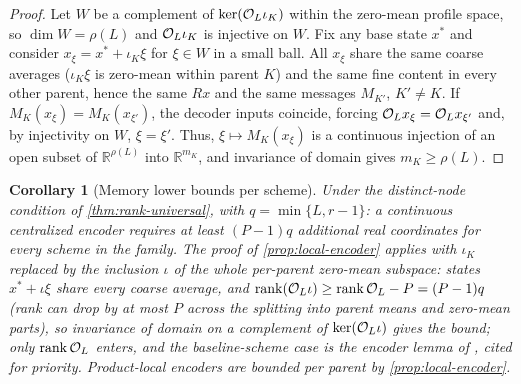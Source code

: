 \documentclass[pdflatex,sn-mathphys-num]{sn-jnl}%
\theoremstyle{thmstyleone}%
\newtheorem{corollary}{Corollary}%
\theoremstyle{thmstyletwo}%
\theoremstyle{thmstylethree}%
\newcommand{\R}{\mathbb R}
\DeclareMathOperator{\rank}{rank}
\newcommand{\OL}{{\cal O}_L}
\begin{document}
\begin{proof}
Let $W$ be a complement of $\ker(\OL\iota_K)$ within the zero-mean profile space, so $\dim W=\rho(L)$ and $\OL\iota_K$ is injective on $W$.
Fix any base state $x^\ast$ and consider $x_\xi=x^\ast+\iota_K\xi$ for $\xi\in W$ in a small ball.
All $x_\xi$ share the same coarse averages ($\iota_K\xi$ is zero-mean within parent $K$) and the same fine content in every other parent, hence the same $Rx$ and the same messages $M_{K'}$, $K'\ne K$.
If $M_K(x_\xi)=M_K(x_{\xi'})$, the decoder inputs coincide, forcing $\OL x_\xi=\OL x_{\xi'}$ and, by injectivity on $W$, $\xi=\xi'$.
Thus, $\xi\mapsto M_K(x_\xi)$ is a continuous injection of an open subset of $\R^{\rho(L)}$ into $\R^{m_K}$, and invariance of domain gives $m_K\ge\rho(L)$.
\end{proof}

\begin{corollary}[Memory lower bounds per scheme]\label{cor:memory-bounds}
Under the distinct-node condition of \cref{thm:rank-universal}, with $q=\min\{L,r-1\}$: a continuous centralized encoder requires at least $(P-1)q$ additional real coordinates for every scheme in the family.
The proof of \cref{prop:local-encoder} applies with $\iota_K$ replaced by the inclusion $\iota$ of the whole per-parent zero-mean subspace: states $x^\ast+\iota\xi$ share every coarse average, and $\rank(\OL\iota)\ge\rank\OL-P=(P-1)q$ (rank can drop by at most $P$ across the splitting into parent means and zero-mean parts), so invariance of domain on a complement of $\ker(\OL\iota)$ gives the bound; only $\rank\OL$ enters, and the baseline-scheme case is the encoder lemma of \cite{PolemitisChristakisDrikakis2026FVerasure}, cited for priority.
Product-local encoders are bounded per parent by \cref{prop:local-encoder}.
\end{corollary}
\end{document}
